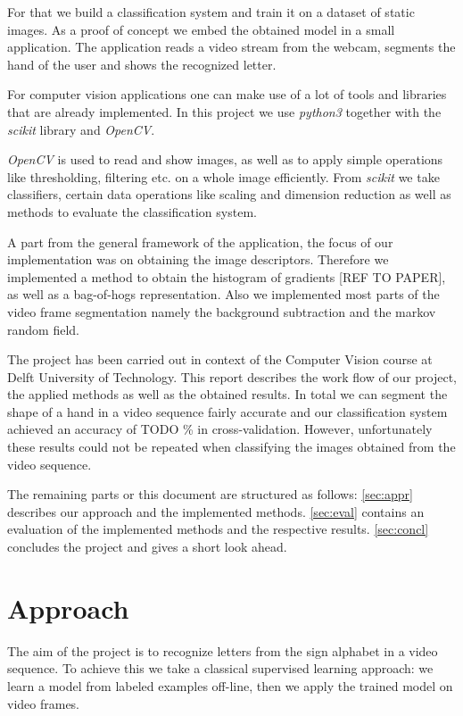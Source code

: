 \documentclass[letterpaper, 10 pt, conference]{ieeeconf}  %
\begin{document}
For that we build a classification system and train it on a dataset of static images. As a proof of concept we embed the obtained model in a small application. The application reads a video stream from the webcam, segments the hand of the user and shows the recognized letter.

For computer vision applications one can make use of a lot of tools and libraries that are already implemented. In this project we use \textit{python3} together with the \textit{scikit} library and \textit{OpenCV}. 

\textit{OpenCV} is used to read and show images, as well as to apply simple operations like thresholding, filtering etc. on a whole image efficiently. From \textit{scikit} we take classifiers, certain data operations like scaling and dimension reduction as well as methods to evaluate the classification system.

A part from the general framework of the application, the focus of our implementation was on obtaining the image descriptors. Therefore we implemented a method to obtain the histogram of gradients [REF TO PAPER], as well as a bag-of-hogs representation. Also we implemented most parts of the video frame segmentation namely the background subtraction and the markov random field.

The project has been carried out in context of the Computer Vision course at Delft University of Technology. This report describes the work flow of our project, the applied methods as well as the obtained results. In total we can segment the shape of a hand in a video sequence fairly accurate and our classification system achieved an accuracy of TODO \% in cross-validation. However, unfortunately these results could not be repeated when classifying the images obtained from the video sequence. 

The remaining parts or this document are structured as follows: \autoref{sec:appr} describes our approach and the implemented methods. \autoref{sec:eval} contains an evaluation of the implemented methods and the respective results. \autoref{sec:concl} concludes the project and gives a short look ahead.


\section{Approach}
\label{sec:appr}
The aim of the project is to recognize letters from the sign alphabet in a video sequence. To achieve this we take a classical supervised learning approach: we learn a model from labeled examples off-line, then we apply the trained model on video frames.
\end{document}
